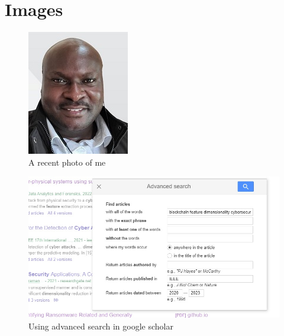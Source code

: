 \documentclass{article}
\begin{document}
\section{Images}
\begin{figure}[H]
 \centering
 \includegraphics[width = .5\textwidth]{images/myImage2.jpg}
 \caption{A recent photo of me}
 \label{fig:float}
\end{figure}
\begin{figure}[H]
 \centering
  \includegraphics{images/myImage4.jpg}
 \caption{Using advanced search in google scholar}
 \label{fig:2}
\end{figure}
\end{document}

